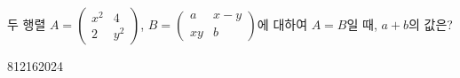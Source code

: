 \hspace*{2mm}\begin{minipage}[t]{\dimexpr\linewidth-2mm\relax}\vspace{0pt}
두 행렬 $A=\begin{pmatrix} x^2 & 4 \\ 2 & y^2 \end{pmatrix}$, $B=\begin{pmatrix} a & x-y \\ xy & b \end{pmatrix}$에 대하여 $A=B$일 때, $a+b$의 값은? 
\begin{choices32}{8}{12}{16}{20}{24}\end{choices32}\end{minipage}
